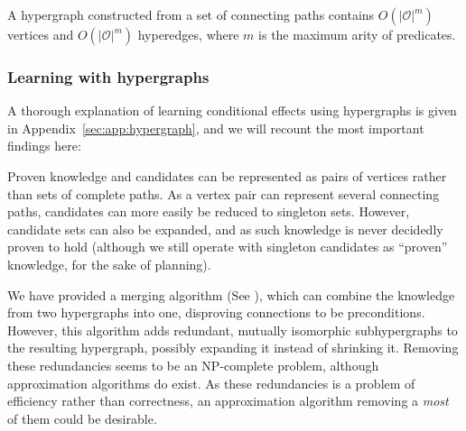 \documentclass[\master/Master.tex]{subfiles}
\begin{document}
A hypergraph constructed from a set of connecting paths contains $O\left(|\mathcal{O}|^m\right)$ vertices and $O\left( |\mathcal{O}|^m\right)$ hyperedges, where $m$ is the maximum arity of predicates. 

\subsubsection*{Learning with hypergraphs}
A thorough explanation of learning conditional effects using hypergraphs is given in Appendix~\ref{sec:app:hypergraph}, and we will recount the most important findings here:

Proven knowledge and candidates can be represented as pairs of vertices rather than sets of complete paths. As a vertex pair can represent several connecting paths, candidates can more easily be reduced to singleton sets. However, candidate sets can also be expanded, and as such knowledge is never decidedly proven to hold (although we still operate with singleton candidates as ``proven'' knowledge, for the sake of planning).

We have provided a merging algorithm (See ), which can combine the knowledge from two hypergraphs into one, disproving connections to be preconditions. However, this algorithm adds redundant, mutually isomorphic subhypergraphs to the resulting hypergraph, possibly expanding it instead of shrinking it. Removing these redundancies seems to be an NP-complete problem, although approximation algorithms do exist. As these redundancies is a problem of efficiency rather than correctness, an approximation algorithm removing a \emph{most} of them could be desirable.
\end{document}
